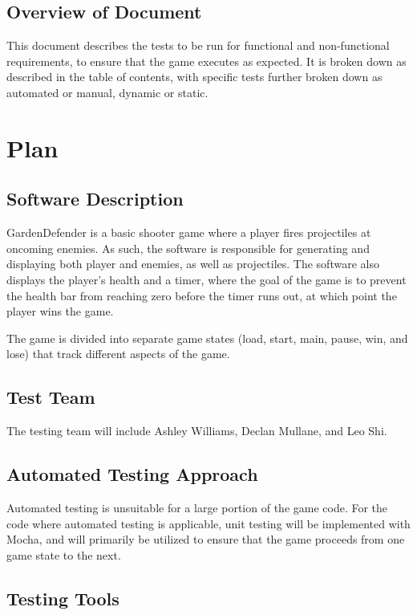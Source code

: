 \documentclass[12pt, titlepage]{article}
\begin{document}
\subsection{Overview of Document}

This document describes the tests to be run for functional and non-functional requirements, to ensure that the game executes as expected. It is broken down as described in the table of contents, with specific tests further broken down as automated or manual, dynamic or static.

\section{Plan}
	
\subsection{Software Description}

GardenDefender is a basic shooter game where a player fires projectiles at oncoming enemies. As such, the software is responsible for generating and displaying both player and enemies, as well as projectiles. The software also displays the player's health and a timer, where the goal of the game is to prevent the health bar from reaching zero before the timer runs out, at which point the player wins the game. 

The game is divided into separate game states (load, start, main, pause, win, and lose) that track different aspects of the game. 

\subsection{Test Team}

The testing team will include Ashley Williams, Declan Mullane, and Leo Shi. 

\subsection{Automated Testing Approach}

Automated testing is unsuitable for a large portion of the game code. For the code where automated testing is applicable, unit testing will be implemented with Mocha, and will primarily be utilized to ensure that the game proceeds from one game state to the next. 

\subsection{Testing Tools}
\end{document}
